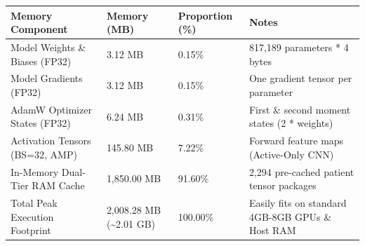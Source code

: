 \begin{tabular}{llll}
\toprule
Memory Component & Memory (MB) & Proportion (\%) & Notes \\
\midrule
Model Weights \& Biases (FP32) & 3.12 MB & 0.15\% & 817,189 parameters * 4 bytes \\
Model Gradients (FP32) & 3.12 MB & 0.15\% & One gradient tensor per parameter \\
AdamW Optimizer States (FP32) & 6.24 MB & 0.31\% & First \& second moment states (2 * weights) \\
Activation Tensors (BS=32, AMP) & 145.80 MB & 7.22\% & Forward feature maps (Active-Only CNN) \\
In-Memory Dual-Tier RAM Cache & 1,850.00 MB & 91.60\% & 2,294 pre-cached patient tensor packages \\
Total Peak Execution Footprint & 2,008.28 MB (\textasciitilde 2.01 GB) & 100.00\% & Easily fits on standard 4GB-8GB GPUs \& Host RAM \\
\bottomrule
\end{tabular}

